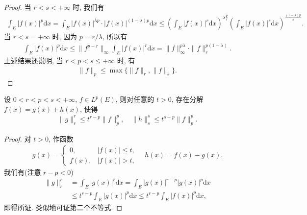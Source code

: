 \documentclass[../../main.tex]{subfiles}%
\begin{document}
\begin{proof}
当 $r<s<+\infty$ 时, 我们有
\begin{align*}
\int_E |f(x)|^p \mathrm{d}x = \int_E |f(x)|^{\lambda p} \cdot |f(x)|^{(1-\lambda)p} \mathrm{d}x 
\leqslant \left( \int_E |f(x)|^r \mathrm{d}x \right)^{\lambda \frac{p}{r}} \left( \int_E |f(x)|^s \mathrm{d}x \right)^{\frac{(1-\lambda)p}{s}}.
\end{align*}
当 $r<s=+\infty$ 时, 因为 $p=r/\lambda$, 所以有
\begin{align*}
\int_E |f(x)|^p \mathrm{d}x \leqslant \|f^{p-r}\|_\infty \int_E |f(x)|^r \mathrm{d}x = \|f\|_\infty^{p\lambda} \cdot \|f\|_r^{p(1-\lambda)}.
\end{align*}
上述结果还说明, 当 $r<p<s\leqslant+\infty$ 时, 有
\begin{align*}
\|f\|_p \leqslant \max\{ \|f\|_r, \|f\|_s \}.
\end{align*}
\end{proof}

\begin{example}
设 $0<r<p<s<+\infty$, $f\in L^p(E)$, 则对任意的 $t>0$, 存在分解 $f(x)=g(x)+h(x)$, 使得
\begin{align*}
\|g\|_r^r \leqslant t^{r-p} \|f\|_p^p, \quad \|h\|_s^s \leqslant t^{s-p} \|f\|_p^p.
\end{align*}
\end{example}

\begin{proof}
对 $t>0$, 作函数
\begin{align*}
g(x) =
\begin{cases}
0, & |f(x)|\leqslant t, \\
f(x), & |f(x)|>t,
\end{cases}
\quad h(x)=f(x)-g(x).
\end{align*}
我们有(注意 $r-p<0$)
\begin{align*}
\|g\|_r^r &= \int_E |g(x)|^r \mathrm{d}x = \int_E |g(x)|^{r-p} |g(x)|^p \mathrm{d}x \\
&\leqslant t^{r-p} \int_E |g(x)|^p \mathrm{d}x \leqslant t^{r-p} \int_E |f(x)|^p \mathrm{d}x,
\end{align*}
即得所证.
类似地可证第二个不等式.
\end{proof}
\end{document}
